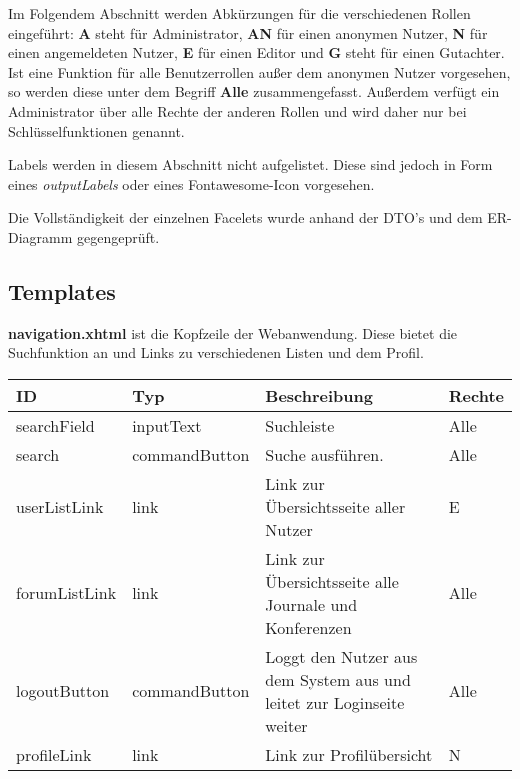 \newcommand{\ftable}[1]{\begin{longtable}[H]{|m{2cm}|m{3cm}|m{6cm}|m{2.5cm}|}
                            \hline
                            \textbf{ID} & \textbf{Typ} & \textbf{Beschreibung} & \textbf{Rechte} \\
                            \hline
                            \hline
                            #1
\end{longtable}
}

\newcommand{\fentry}[4]{#1 & #2 & #3 & #4 \\
\hline}



Im Folgendem Abschnitt werden Abkürzungen für die verschiedenen Rollen eingeführt:
\textbf{A} steht für Administrator, \textbf{AN} für einen anonymen Nutzer, \textbf{N} für einen angemeldeten Nutzer, \textbf{E} für einen Editor und \textbf{G} steht für einen Gutachter.
Ist eine Funktion für alle Benutzerrollen außer dem anonymen Nutzer vorgesehen, so werden diese unter dem Begriff \textbf{Alle} zusammengefasst.
Außerdem verfügt ein Administrator über alle Rechte der anderen Rollen und wird daher nur bei Schlüsselfunktionen genannt.

Labels werden in diesem Abschnitt nicht aufgelistet.
Diese sind jedoch in Form eines \emph{outputLabels} oder eines Fontawesome-Icon vorgesehen.

Die Vollständigkeit der einzelnen Facelets wurde anhand der DTO's und dem ER-Diagramm gegengeprüft.

\subsection{Templates}



\begin{samepage}
    \textbf{navigation.xhtml} \label{flt:navbar} ist die Kopfzeile der Webanwendung. Diese bietet die Suchfunktion an und Links zu verschiedenen Listen und dem Profil.
    \nopagebreak

    \ftable{
        \fentry{searchField}{inputText}{Suchleiste}{Alle}

        \fentry{search}{commandButton}{Suche ausführen.}{Alle}

        \fentry{userListLink}{link}{Link zur Übersichtsseite aller Nutzer}{E}

        \fentry{forumListLink}{link}{Link zur Übersichtsseite alle Journale und Konferenzen}{Alle}

        \fentry{logoutButton}{commandButton}{Loggt den Nutzer aus dem System aus und leitet zur Loginseite weiter}{Alle}

        \fentry{profileLink}{link}{Link zur Profilübersicht}{N}

    }
\end{samepage}

